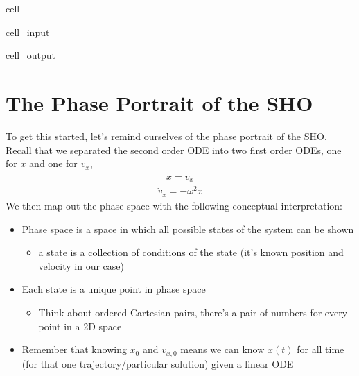 \documentclass[letterpaper,10pt,english]{jupyterBook}
\begin{document}
\begin{sphinxuseclass}{cell}
\begin{sphinxVerbatimInput}
\begin{sphinxuseclass}{cell_input}
\end{sphinxuseclass}\end{sphinxVerbatimInput}
\begin{sphinxVerbatimOutput}

\begin{sphinxuseclass}{cell_output}
\noindent{}

\end{sphinxuseclass}\end{sphinxVerbatimOutput}

\end{sphinxuseclass}

\section{The Phase Portrait of the SHO}
\label{\detokenize{content/1_mechanics/dynamical_1:the-phase-portrait-of-the-sho}}
\sphinxAtStartPar
To get this started, let’s remind ourselves of the phase portrait of the SHO. Recall that we separated the second order ODE into two first order ODEs, one for \(x\) and one for \(v_x\),
\begin{equation*}
\begin{split}\dot{x} = v_x\end{split}
\end{equation*}\begin{equation*}
\begin{split}\dot{v}_x=-\omega^2x\end{split}
\end{equation*}
\sphinxAtStartPar
We then map out the phase space with the following conceptual interpretation:
\begin{itemize}
\item {} 
\sphinxAtStartPar
Phase space is a space in which all possible states of the system can be shown
\begin{itemize}
\item {} 
\sphinxAtStartPar
a state is a collection of conditions of the state (it’s known position and velocity in our case)

\end{itemize}

\item {} 
\sphinxAtStartPar
Each state is a unique point in phase space
\begin{itemize}
\item {} 
\sphinxAtStartPar
Think about ordered Cartesian pairs, there’s a pair of numbers for every point in a 2D space

\end{itemize}

\item {} 
\sphinxAtStartPar
Remember that knowing \(x_0\) and \(v_{x,0}\) means we can know \(x(t)\) for all time (for that one trajectory/particular solution) given a linear ODE

\end{itemize}
\end{document}
